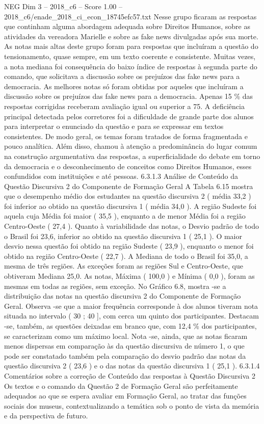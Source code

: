 \begin{textsample}{NEG Dim 3 – 2018\_c6 – Score 1.00 – 2018\_c6/enade\_2018\_ci\_econ\_18745efc57.txt}
Nesse grupo ficaram as respostas que continham alguma abordagem adequada sobre Direitos Humanos, sobre as atividades da vereadora Marielle e sobre as fake news divulgadas após sua morte.
As notas mais altas deste grupo foram para respostas que incluíram a questão do tensionamento, quase sempre, em um texto coerente e consistente.
Muitas vezes, a nota mediana foi consequência do baixo índice de respostas à segunda parte do comando, que solicitava a discussão sobre os prejuízos das fake news para a democracia.
As melhores notas só foram obtidas por aqueles que incluíram a discussão sobre os prejuízos das fake news para a democracia.
Apenas 15 \% das respostas corrigidas receberam avaliação igual ou superior a 75.
A deficiência principal detectada pelos corretores foi a dificuldade de grande parte dos alunos para interpretar o enunciado da questão e para se expressar em textos consistentes.
De modo geral, os temas foram tratados de forma fragmentada e pouco analítica.
Além disso, chamou à atenção a predominância do lugar comum na construção argumentativa das respostas, a superficialidade do debate em torno da democracia e o desconhecimento de conceitos como Direitos Humanos, esses confundidos com instituições e até pessoas. 6.3.1.3 Análise de Conteúdo da Questão Discursiva 2 do Componente de Formação Geral A Tabela 6.15 mostra que o desempenho médio dos estudantes na questão discursiva 2 ( média 33,2 ) foi inferior ao obtido na questão discursiva 1 ( média 34,0 ).
A região Sudeste foi aquela cuja Média foi maior ( 35,5 ), enquanto a de menor Média foi a região Centro-Oeste ( 27,4 ).
Quanto à variabilidade das notas, o Desvio padrão de todo o Brasil foi 23,6, inferior ao obtido na questão discursiva 1 ( 25,1 ).
O maior desvio nessa questão foi obtido na região Sudeste ( 23,9 ), enquanto o menor foi obtido na região Centro-Oeste ( 22,7 ).
A Mediana de todo o Brasil foi 35,0, a mesma de três regiões.
As exceções foram as regiões Sul e Centro-Oeste, que obtiveram Mediana 25,0.
As notas, Máxima ( 100,0 ) e Mínima ( 0,0 ), foram as mesmas em todas as regiões, sem exceção.
No Gráfico 6.8, mostra -se a distribuição das notas na questão discursiva 2 do Componente de Formação Geral.
Observa -se que a maior frequência corresponde à dos alunos tiveram nota situada no intervalo ( 30 ; 40 ], com cerca um quinto dos participantes.
Destacam -se, também, as questões deixadas em branco que, com 12,4 \% dos participantes, se caracterizam como um máximo local.
Nota -se, ainda, que as notas ficaram menos dispersas em comparação às da questão discursiva de número 1, o que pode ser constatado também pela comparação do desvio padrão das notas da questão discursiva 2 ( 23,6 ) e o das notas da questão discursiva 1 ( 25,1 ). 6.3.1.4 Comentários sobre a correção de Conteúdo das respostas à Questão Discursiva 2 Os textos e o comando da Questão 2 de Formação Geral são perfeitamente adequados ao que se espera avaliar em Formação Geral, ao tratar das funções sociais dos museus, contextualizando a temática sob o ponto de vista da memória e da perspectiva de futuro.

\end{textsample}
